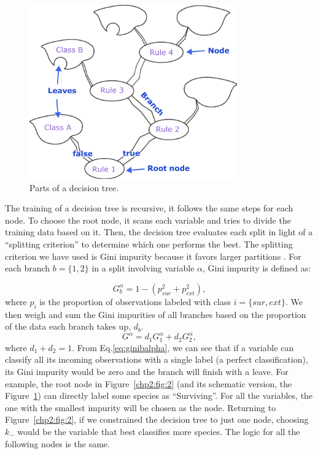 \begin{figure}
    \centering
   \includegraphics[width=0.8\textwidth]{figures/appendices/DT.pdf}
   
    \caption[Parts of a decision tree]{Parts of a decision tree.}
   \label{app:fig:DT}
\end{figure}

The training of a decision tree is recursive, it follows the same steps for each node. To choose the root node, it scans each variable and tries to divide the training data based on it. Then, the decision tree evaluates each split in light of a ``splitting criterion'' to determine which one performs the best. The splitting criterion we have used is Gini impurity because it favors larger partitions \cite{growingdecisiontrees}. For each branch $b = \{1,2\}$ in a split involving variable $\alpha$, Gini impurity is defined as:

\begin{equation}
   G_b^\alpha = 1- (p_{sur}^2 + p_{ext}^2), 
   \label{eq:ginibalpha}
\end{equation}
where $p_{i}$ is the proportion of observations labeled with class $i = \{sur,ext\}$. We then weigh and sum the Gini impurities of all branches based on the proportion of the data each branch takes up, $d_b$.
\begin{equation}
    G^\alpha  =  d_1 G_1^\alpha + d_2 G_2^\alpha,
    \label{eq:ginialpha}
\end{equation}
where $d_1+d_2=1$. From Eq.\eqref{eq:ginibalpha}, we can see that if a variable can classify all its incoming observations with a single label (a perfect classification), its Gini impurity would be zero and the branch will finish with a leave. For example, the root node in Figure~\ref{chp2:fig:2} (and its schematic version, the Figure~\ref{app:fig:DT}) can directly label some species as ``Surviving''. For all the variables, the one with the smallest impurity will be chosen as the node. Returning to Figure~\ref{chp2:fig:2}, if we constrained the decision tree to just one node, choosing $k_-$ would be the variable that best classifies more species. The logic for all the following nodes is the same. \\

